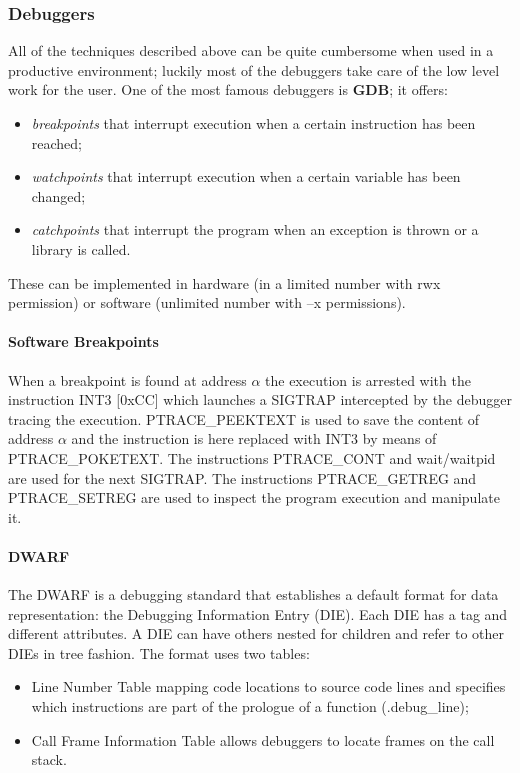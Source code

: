 \subsubsection{Debuggers}
All of the techniques described above can be quite cumbersome when used in a productive environment; luckily most of the
debuggers take care of the low level work for the user. One of the most famous debuggers is \textbf{GDB}; it offers:
\begin{itemize}
    \item \textit{breakpoints} that interrupt execution when a certain instruction has been reached;
    \item \textit{watchpoints} that interrupt execution when a certain variable has been changed;
    \item \textit{catchpoints} that interrupt the program when an exception is thrown or a library is called.
\end{itemize}
These can be implemented in hardware (in a limited number with {\ttfamily rwx} permission) or software (unlimited number
with {\ttfamily --x} permissions).

\paragraph{Software Breakpoints}
When a breakpoint is found at address $\alpha$ the execution is arrested with the instruction {\ttfamily INT3 [0xCC]}
which launches a {\ttfamily SIGTRAP} intercepted by the debugger tracing the execution. {\ttfamily PTRACE\_PEEKTEXT} is
used to save the content of address $\alpha$ and the instruction is here replaced with {\ttfamily INT3} by means of
{\ttfamily PTRACE\_POKETEXT}. The instructions {\ttfamily PTRACE\_CONT} and {\ttfamily wait/waitpid} are used for the
next {\ttfamily SIGTRAP}. The instructions {\ttfamily PTRACE\_GETREG} and {\ttfamily PTRACE\_SETREG} are used to
inspect the program execution and manipulate it.

\paragraph{DWARF}
The DWARF is a debugging standard that establishes a default format for data representation: the Debugging Information
Entry (DIE). Each DIE has a tag and different attributes. A DIE can have others nested for children and refer to other
DIEs in tree fashion. The format uses two tables:
\begin{itemize}
    \item Line Number Table mapping code locations to source code lines and specifies which instructions are part of the
        prologue of a function ({\ttfamily .debug\_line});
    \item Call Frame Information Table allows debuggers to locate frames on the call stack.
\end{itemize}

